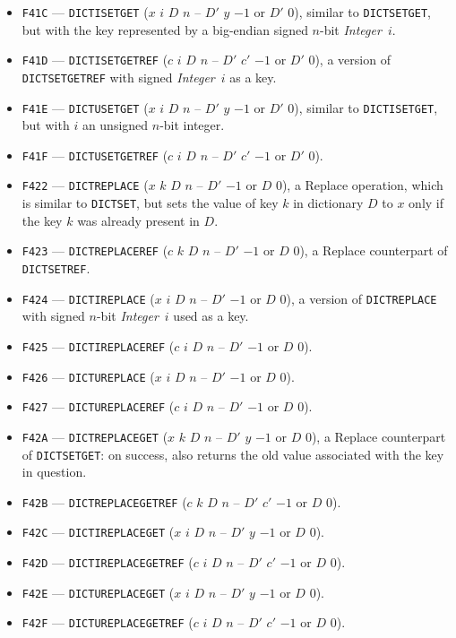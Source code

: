 \documentclass[12pt,oneside]{article}
\begin{document}
\begin{itemize}
\item {\tt F41C} --- {\tt DICTISETGET} ($x$ $i$ $D$ $n$ -- $D'$ $y$ $-1$ or $D'$ $0$), similar to {\tt DICTSETGET}, but with the key represented by a big-endian signed $n$-bit {\em Integer\/}~$i$.
\item {\tt F41D} --- {\tt DICTISETGETREF} ($c$ $i$ $D$ $n$ -- $D'$ $c'$ $-1$ or $D'$ $0$), a version of {\tt DICTSETGETREF} with signed {\em Integer}~$i$ as a key.
\item {\tt F41E} --- {\tt DICTUSETGET} ($x$ $i$ $D$ $n$ -- $D'$ $y$ $-1$ or $D'$ $0$), similar to {\tt DICTISETGET}, but with $i$ an unsigned $n$-bit integer.
\item {\tt F41F} --- {\tt DICTUSETGETREF} ($c$ $i$ $D$ $n$ -- $D'$ $c'$ $-1$ or $D'$ $0$).
\item {\tt F422} --- {\tt DICTREPLACE} ($x$ $k$ $D$ $n$ -- $D'$ $-1$ or  $D$ $0$), a {\sc Replace} operation, which is similar to {\tt DICTSET}, but sets the value of key $k$ in dictionary $D$ to $x$ only if the key $k$ was already present in $D$.
\item {\tt F423} --- {\tt DICTREPLACEREF} ($c$ $k$ $D$ $n$ -- $D'$ $-1$ or $D$ $0$), a {\sc Replace} counterpart of {\tt DICTSETREF}.
\item {\tt F424} --- {\tt DICTIREPLACE} ($x$ $i$ $D$ $n$ -- $D'$ $-1$ or $D$ $0$), a version of {\tt DICTREPLACE} with signed $n$-bit {\em Integer}~$i$ used as a key.
\item {\tt F425} --- {\tt DICTIREPLACEREF} ($c$ $i$ $D$ $n$ -- $D'$ $-1$ or $D$ $0$).
\item {\tt F426} --- {\tt DICTUREPLACE} ($x$ $i$ $D$ $n$ -- $D'$ $-1$ or $D$ $0$).
\item {\tt F427} --- {\tt DICTUREPLACEREF} ($c$ $i$ $D$ $n$ -- $D'$ $-1$ or $D$ $0$).
\item {\tt F42A} --- {\tt DICTREPLACEGET} ($x$ $k$ $D$ $n$ -- $D'$ $y$ $-1$ or $D$ $0$), a {\sc Replace} counterpart of {\tt DICTSETGET}: on success, also returns the old value associated with the key in question.
\item {\tt F42B} --- {\tt DICTREPLACEGETREF} ($c$ $k$ $D$ $n$ -- $D'$ $c'$ $-1$ or $D$ $0$).
\item {\tt F42C} --- {\tt DICTIREPLACEGET} ($x$ $i$ $D$ $n$ -- $D'$ $y$ $-1$ or $D$ $0$).
\item {\tt F42D} --- {\tt DICTIREPLACEGETREF} ($c$ $i$ $D$ $n$ -- $D'$ $c'$ $-1$ or $D$ $0$).
\item {\tt F42E} --- {\tt DICTUREPLACEGET} ($x$ $i$ $D$ $n$ -- $D'$ $y$ $-1$ or $D$ $0$).
\item {\tt F42F} --- {\tt DICTUREPLACEGETREF} ($c$ $i$ $D$ $n$ -- $D'$ $c'$ $-1$ or $D$ $0$).

\end{itemize}
\end{document}
